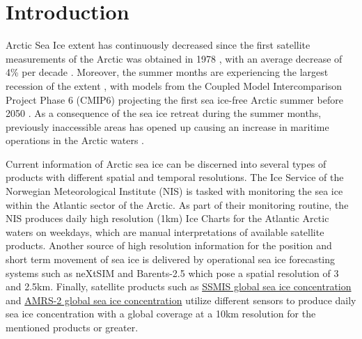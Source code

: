 \documentclass[../main/thesis.tex]{subfiles}
\begin{document}
\section{Introduction}
Arctic Sea Ice extent has continuously decreased since the first satellite measurements of the Arctic was obtained in 1978 \cite{Serreze2019}, with an average decrease of 4\% per decade \cite{Cavalieri2012}. Moreover, the summer months are experiencing the largest recession of the extent \cite{Comiso2017}, with models from the Coupled Model Intercomparison Project Phase 6 (CMIP6) projecting the first sea ice-free Arctic summer before 2050 \cite{Notz2020}. As a consequence of the sea ice retreat during the summer months, previously inaccessible areas has opened up causing an increase in maritime operations in the Arctic waters \cite{Eguiluz2016}.

Current information of Arctic sea ice can be discerned into several types of products with different spatial and temporal resolutions. The Ice Service of the Norwegian Meteorological Institute (NIS) is tasked with monitoring the sea ice within the Atlantic sector of the Arctic. As part of their monitoring routine, the NIS produces daily high resolution (1km) Ice Charts for the Atlantic Arctic waters on weekdays, which are manual interpretations of available satellite products. Another source of high resolution information for the position and short term movement of sea ice is delivered by operational sea ice forecasting systems such as neXtSIM \cite{Williams2021} and Barents-2.5 \cite{Roehrs2022} which pose a spatial resolution of 3 and 2.5km. Finally, satellite products such as \href{https://osi-saf.eumetsat.int/products/osi-401-b}{SSMIS global sea ice concentration} and \href{https://osi-saf.eumetsat.int/products/osi-408}{AMRS-2 global sea ice concentration} utilize different sensors to produce daily sea ice concentration with a global coverage at a 10km resolution for the mentioned products or greater. 
\end{document}
